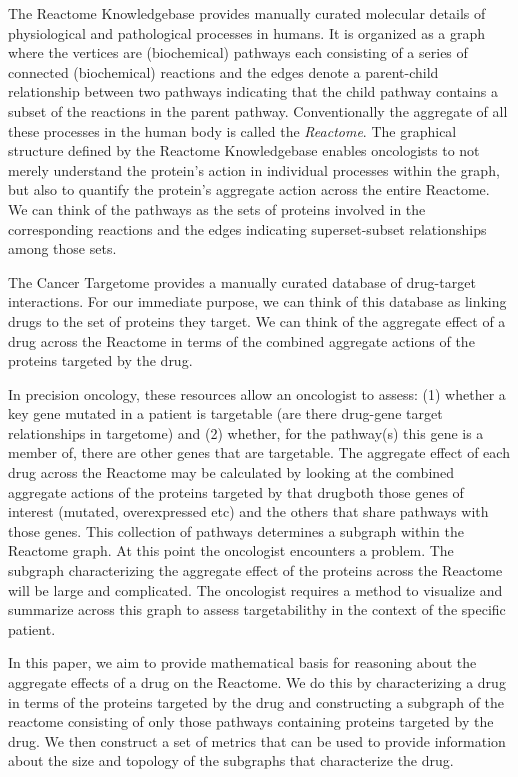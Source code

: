 \documentclass{article}
\begin{document}
The Reactome Knowledgebase provides manually curated molecular details of physiological and pathological processes in humans.\cite{10.1093/nar/gkab1028} It is organized as a graph where the vertices are (biochemical) pathways each consisting of a series of connected (biochemical) reactions and the edges denote a parent-child relationship between two pathways indicating that the child pathway contains a subset of the reactions in the parent pathway. Conventionally the aggregate of all these processes in the human body is called the \noindent\textit{Reactome}. The graphical structure defined by the Reactome Knowledgebase enables oncologists to not merely understand the protein's action in individual processes within the graph, but also to quantify the protein's aggregate action across the entire Reactome. We can think of the pathways as the sets of proteins involved in the corresponding reactions and the edges indicating superset-subset relationships among those sets.

The Cancer Targetome provides a manually curated database of drug-target interactions.\cite{BLUCHER20171085} For our immediate purpose, we can think of this database as linking drugs to the set of proteins they target. We can think of the aggregate effect of a drug across the Reactome in terms of the combined aggregate actions of the proteins targeted by the drug.

In precision oncology, these resources allow an oncologist to assess: (1) whether a key gene mutated in a patient is targetable (are there drug-gene target relationships in targetome) and (2) whether, for the pathway(s) this gene is a member of, there are other genes that are targetable. The aggregate effect of each drug across the Reactome may be calculated by looking at the combined aggregate actions of the proteins targeted by that drug\textemdash both those genes of interest (mutated, overexpressed etc) and the others that share pathways with those genes. This collection of pathways determines a subgraph within the Reactome graph. At this point the oncologist encounters a problem. The subgraph characterizing the aggregate effect of the proteins across the Reactome will be large and complicated. The oncologist requires a method to visualize and summarize across this graph to assess targetabilithy in the context of the specific patient. 

In this paper, we aim to provide mathematical basis for reasoning about the aggregate effects of a drug on the Reactome. We do this by characterizing a drug in terms of the proteins targeted by the drug and constructing a subgraph of the reactome consisting of only those pathways containing proteins targeted by the drug. We then construct a set of metrics that can be used to provide information about the size and topology of the subgraphs that characterize the drug.
\end{document}
